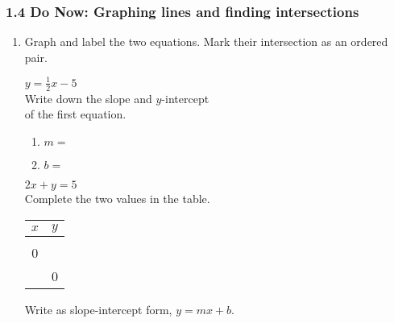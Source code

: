 \documentclass[12pt, twoside]{article}
\begin{document}
\subsubsection*{1.4 Do Now: Graphing lines and finding intersections}
\begin{enumerate}
  \item Graph and label the two equations. Mark their intersection as an ordered pair.

  \begin{multicols}{2}
    $y = \frac{1}{2}x-5$ \\[0.5cm]
    Write down the slope and $y$-intercept\\ of the first equation.
    \begin{enumerate}
      \item $m=$ \bigskip
      \item $b=$
    \end{enumerate} \vspace{1cm}

    $2x+y = 5$ \\
    Complete the two values in the table.
      \begin{flushleft}
      \begin{tabular}{c|c}
            $x$ & $y$ \\
            \hline \\
             0 & \underline{\hspace{1cm}} \\[5pt]
             \underline{\hspace{1cm}}  & 0 \\
          \end{tabular}
        \end{flushleft}
        Write as slope-intercept form, $y=mx+b$.
    \end{multicols} \vspace{1cm}

  \begin{center} %
  \end{center}


\end{enumerate}
\end{document}
